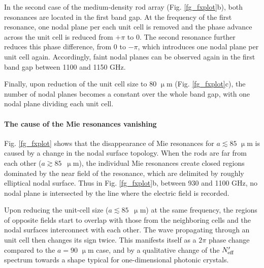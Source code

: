 In the second case of the medium-density rod array (Fig. \ref{fg_fxplot}b), both resonances are located in the first band gap. At the frequency of the first resonance, one nodal plane per each unit cell is removed and the phase advance across the unit cell is reduced from $+\pi$ to $0$. The second resonance further reduces this phase difference, from $0$ to $-\pi$, which introduces one nodal plane per unit cell again. Accordingly, faint nodal planes can be observed again in the first band gap between 1100 and 1150 GHz. 

Finally, upon reduction of the unit cell size to $80$ $\upmu$m (Fig. \ref{fg_fxplot}c), the number of nodal planes becomes a constant over the whole band gap, with one nodal plane dividing each unit cell. 

\paragraph{The cause of the Mie resonances vanishing}%
Fig. \ref{fg_fxplot} shows that the  disappearance of Mie resonances for $a\lesssim 85$ $\upmu$m is caused by a change in the nodal surface topology. When the rods are far from each other ($a\gtrsim 85$~$\upmu$m), the individual Mie resonances create closed regions dominated by the near field of the resonance, which are delimited by roughly elliptical nodal surface. Thus in Fig.  \ref{fg_fxplot}b, between 930 and 1100 GHz,  %
no nodal plane is intersected by the line where the electric field is recorded.

Upon reducing the unit-cell size ($a\lesssim 85$~$\upmu$m) at the same frequency, the regions of opposite fields start to overlap with those from the neighboring cells and the nodal surfaces interconnect with each other. The wave propagating through an unit cell then changes its sign twice. This manifests itself as a $2\pi$ phase change compared to the $a=90$ $\upmu$m case, and by a qualitative change of the $N_{\text{eff} }'$ spectrum towards a shape typical for one-dimensional photonic crystals.


